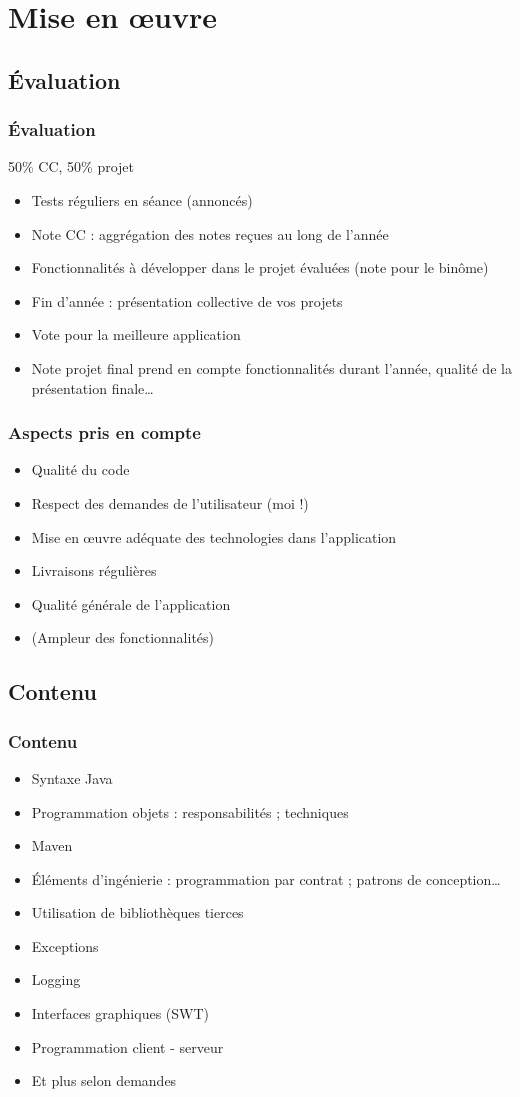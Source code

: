 \documentclass[english, french]{beamer}
\begin{document}
\section{Mise en œuvre}
\subsection{Évaluation}
\begin{frame}
	\frametitle{Évaluation}
	50\% CC, 50\% projet
	\begin{itemize}
		\item Tests réguliers en séance (annoncés)
		\item Note CC : aggrégation des notes reçues au long de l’année
		\item Fonctionnalités à développer dans le projet évaluées (note pour le binôme)
		\item Fin d’année : présentation collective de vos projets
		\item Vote pour la meilleure application
		\item Note projet final prend en compte fonctionnalités durant l’année, qualité de la présentation finale…
	\end{itemize}
\end{frame}

\begin{frame}
	\frametitle{Aspects pris en compte}
	\begin{itemize}
		\item Qualité du code 
		\item Respect des demandes de l’utilisateur (moi !)
		\item Mise en œuvre adéquate des technologies dans l’application
		\item Livraisons régulières
		\item Qualité générale de l’application
		\item (Ampleur des fonctionnalités)
	\end{itemize}
\end{frame}

\subsection{Contenu}
\begin{frame}
	\frametitle{Contenu}
	\begin{itemize}
		\item Syntaxe Java
		\item Programmation objets : responsabilités ; techniques
		\item Maven
		\item Éléments d’ingénierie : programmation par contrat ; patrons de conception…
		\item Utilisation de bibliothèques tierces
		\item Exceptions
		\item Logging
		\item Interfaces graphiques (SWT)
		\item Programmation client - serveur
		\item Et plus selon demandes
	\end{itemize}
\end{frame}
\end{document}
